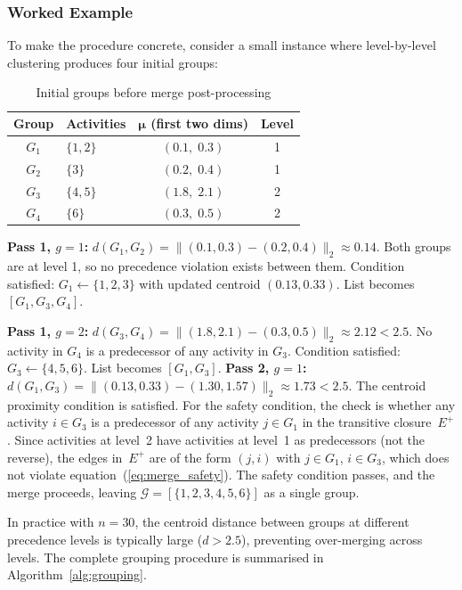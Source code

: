 \subsubsection{Worked Example}
\label{subsubsec:merge_example}

To make the procedure concrete, consider a small instance
where level-by-level clustering produces four initial groups:

\begin{table}[ht]
\centering
\renewcommand{\arraystretch}{1.3}
\caption{Initial groups before merge post-processing}
\label{tab:merge_example}
\begin{tabular}{clcc}
\hline
\textbf{Group} &
\textbf{Activities} &
$\boldsymbol{\mu}$ (first two dims) &
\textbf{Level} \\
\hline
$G_1$ & $\{1, 2\}$ & $(0.1,\; 0.3)$ & 1 \\
$G_2$ & $\{3\}$    & $(0.2,\; 0.4)$ & 1 \\
$G_3$ & $\{4, 5\}$ & $(1.8,\; 2.1)$ & 2 \\
$G_4$ & $\{6\}$    & $(0.3,\; 0.5)$ & 2 \\
\hline
\end{tabular}
\end{table}

\noindent
\textbf{Pass 1, $g=1$:}
$d(G_1, G_2) = \|(0.1,0.3)-(0.2,0.4)\|_2 \approx 0.14$.
Both groups are at level 1, so no precedence violation
exists between them.
Condition satisfied: $G_1 \leftarrow \{1,2,3\}$ with
updated centroid $(0.13, 0.33)$.
List becomes $[G_1, G_3, G_4]$.

\noindent
\textbf{Pass 1, $g=2$:}
$d(G_3, G_4) = \|(1.8,2.1)-(0.3,0.5)\|_2 \approx 2.12 < 2.5$.
No activity in $G_4$ is a predecessor of any activity in
$G_3$.
Condition satisfied: $G_3 \leftarrow \{4,5,6\}$.
List becomes $[G_1, G_3]$.
\noindent
\textbf{Pass 2, $g=1$:}
$d(G_1, G_3) = \|(0.13,0.33)-(1.30,1.57)\|_2 \approx 1.73 < 2.5$.
The centroid proximity condition is satisfied. For the
safety condition, the check is whether any activity
$i \in G_3$ is a predecessor of any activity $j \in G_1$
in the transitive closure~$E^+$. Since activities at
level~2 have activities at level~1 as predecessors (not
the reverse), the edges in~$E^+$ are of the form
$(j,i)$ with $j \in G_1$, $i \in G_3$, which does not
violate equation~(\ref{eq:merge_safety}). The safety
condition passes, and the merge proceeds, leaving
$\mathcal{G} = [\{1,2,3,4,5,6\}]$ as a single group.

In practice with $n = 30$, the centroid distance between
groups at different precedence levels is typically large
($d > 2.5$), preventing over-merging across levels.
The complete grouping procedure is summarised in
Algorithm~\ref{alg:grouping}.
